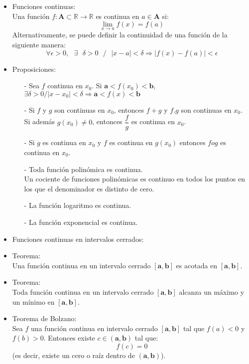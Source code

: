 \documentclass[a4paper,11pt]{report}
\begin{document}
\begin{itemize}
\begin{itemize}
\begin{enumerate}
\end{enumerate}
\item Funciones continuas: \\
Una función $f: \mathbf{A} \subset \mathbb{R} \to \mathbb{R}$ es continua en $a \in \mathbf{A}$ si: \\
$$\displaystyle \lim_{x\to a} f(x) = f(a)$$
Alternativamente, se puede definir la continuidad de una función de la siguiente manera:
$$\forall \epsilon > 0,\text{ } \exists \text{ }\delta > 0 \text{ }/ \text{ }|x-a|<\delta \Longrightarrow |f(x) - f(a)| < \epsilon$$ 
\item Proposiciones:
\begin{itemize}
\item[-] Sea $f$ continua en $x_0$. Si $\mathbf{a} < f(x_0) < \mathbf{b}$, \\
$\exists \delta > 0 / |x-x_0| < \delta \Longrightarrow \mathbf{a}<f(x)<\mathbf{b}$
\item[-] Si $f$ y $g$ son continuas en $x_0$, entonces $f+g$ y $f.g$ son continuas en $x_0$. \\
Si además $g(x_0)\neq 0$, entonces $\dfrac{f}{g}$ es continua en $x_0$.
\item[-] Si $g$ es continua en $x_0$ y $f$ es continua en $g(x_0)$ entonces $f o g$ es continua en $x_0$.
\item[-] Toda función polinómica es continua. \\
Un cociente de funciones polinómicas es continuo en todos los puntos en los que el denominador es distinto de cero.
\item[-] La función logaritmo es continua.
\item[-] La función exponencial es continua.
\end{itemize}
\item Funciones continuas en intervalos cerrados:
\item Teorema: \\
Una función continua en un intervalo cerrado $\mathbf{[a,b]}$ es acotada en $\mathbf{[a,b]}$.
\item Teorema: \\
Toda función continua en un intervalo cerrado $\mathbf{[a,b]}$ alcanza un máximo y un mínimo en $\mathbf{[a,b]}$.
\item Teorema de Bolzano: \\
Sea $f$ una función continua en intervalo cerrado $\mathbf{[a,b]}$ tal que $f(a) < 0$ y $f(b) >0$. Entonces existe $c \in \mathbf{(a,b)}$ tal que: \\
$$f(c)=0$$
(es decir, existe un cero o raíz dentro de $\mathbf{(a,b)}$). \\

\end{itemize}
\end{itemize}
\end{document}
